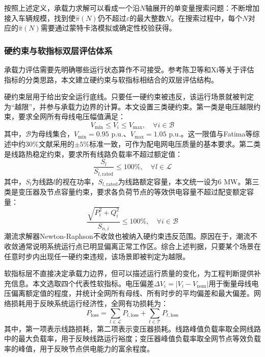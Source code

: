 \documentclass[10pt,a4paper]{article}
\numberwithin{equation}{section}
\numberwithin{table}{section}
\numberwithin{figure}{section}
\begin{document}
    按照上述定义，承载力求解可以看成一个沿$N$轴展开的单变量搜索问题：不断增加接入车辆规模，找到使$\hat{\pi}(N)$仍不超过$\varepsilon$的最大整数$N$。在搜索过程中，每个$N$对应的$\hat{\pi}(N)$需要通过蒙特卡洛模拟或确定性校验获得。

    \subsubsection{硬约束与软指标双层评估体系}

    承载力评估需要先明确哪些运行状态算作不可接受。参考陈卫等\supercite{ref13}和Xi等\supercite{ref18}关于评估指标的分类思路，本文建立硬约束与软指标相结合的双层评估结构。

    硬约束层用于给出安全运行底线。只要任一硬约束被违反，该运行场景就被判定为“越限”，并参与承载力边界的计算。本文设置三类硬约束。第一类是电压越限约束，要求全网所有母线电压幅值满足：
    \begin{equation}
    \label{eq:voltage_constraint}
    V_{\min} \leq V_i \leq V_{\max}, \quad \forall i \in \mathcal{B}
    \end{equation}
    其中，$\mathcal{B}$为母线集合，$V_{\min} = 0.95$ p.u.、$V_{\max} = 1.05$ p.u.。这一限值与Fatima等\supercite{ref6}综述中约30\%文献采用的$\pm 5\%$标准一致，可作为配电网电压质量的基本要求。第二类是线路热稳定约束，要求所有线路负载率不超过额定值：
    \begin{equation}
    \label{eq:line_loading_constraint}
    \frac{S_l}{S_{l,\text{rated}}} \leq 100\%, \quad \forall l \in \mathcal{L}
    \end{equation}
    其中，$S_l$为线路$l$的视在功率，$S_{l,\text{rated}}$为线路额定容量，本文统一设为6 MW。第三类是变压器及节点容量约束，要求各负荷节点的等效供电容量不超过配变额定容量：
    \begin{equation}
    \label{eq:node_capacity_constraint}
    \frac{\sqrt{P_i^2 + Q_i^2}}{S_{n,i}} \leq 100\%, \quad \forall i \in \mathcal{B}
    \end{equation}
    潮流求解器Newton-Raphson不收敛也被纳入硬约束违反范围。原因在于，潮流不收敛通常说明系统运行点已明显偏离正常工作区。综合上述判据，只要某个场景在任意时步内出现任一硬约束违规，该场景即被判定为越限。

    软指标层不直接决定承载力边界，但可以描述运行质量的变化，为工程判断提供补充信息。本文选取四个代表性软指标。电压偏差$\Delta V_i = |V_i - V_{\text{nom}}|$用于衡量母线电压偏离额定值的程度，并统计全网所有母线、所有时步的平均偏差和最大偏差。网络损耗用于反映系统运行经济性，全网有功损耗为：
    \begin{equation}
    \label{eq:network_loss}
    P_{\text{loss}} = \sum_{l \in \mathcal{L}} P_{l,\text{loss}} + \sum_{t \in \mathcal{T}} P_{t,\text{loss}}
    \end{equation}
    其中，第一项表示线路损耗，第二项表示变压器损耗。线路峰值负载率取全网线路中的最大负载率，用于反映线路运行裕度；变压器峰值负载率取全网节点等效负载率的峰值，用于反映节点供电能力的富余程度。
\end{document}
